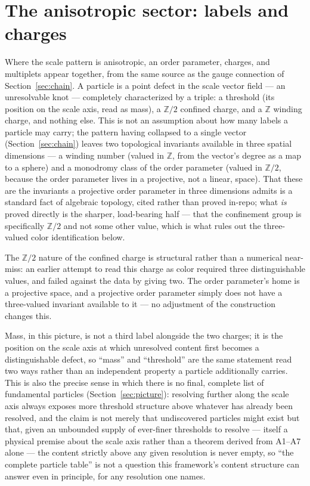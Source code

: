 \documentclass[aps,prd,twocolumn,superscriptaddress,nofootinbib]{revtex4-2}
\begin{document}
\section{The anisotropic sector: labels and charges}\label{sec:particles}

Where the scale pattern is anisotropic, an order parameter, charges, and
multiplets appear together, from the same source as the gauge connection
of Section~\ref{sec:chain}. A particle is a point defect in the scale
vector field — an unresolvable knot — completely characterized by a
triple: a threshold (its position on the scale axis, read as mass), a
$\mathbb{Z}/2$ confined charge, and a $\mathbb{Z}$ winding charge, and
nothing else. This is not an assumption about how many labels a particle
may carry; the pattern having collapsed to a single vector
(Section~\ref{sec:chain}) leaves two topological invariants available in
three spatial dimensions — a winding number (valued in $\mathbb{Z}$,
from the vector's degree as a map to a sphere) and a monodromy class of
the order parameter (valued in $\mathbb{Z}/2$, because the order
parameter lives in a projective, not a linear, space). That these are
the invariants a projective order parameter in three dimensions admits
is a standard fact of algebraic topology, cited rather than proved
in-repo; what \emph{is} proved directly is the sharper, load-bearing
half — that the confinement group is specifically $\mathbb{Z}/2$ and not
some other value, which is what rules out the three-valued color
identification below.

The $\mathbb{Z}/2$ nature of the confined charge is structural rather
than a numerical near-miss: an earlier attempt to read this charge as
color required three distinguishable values, and failed against the data
by giving two. The order parameter's home is a projective space, and a
projective order parameter simply does not have a three-valued invariant
available to it — no adjustment of the construction changes this.

Mass, in this picture, is not a third label alongside the two charges; it
is the position on the scale axis at which unresolved content first
becomes a distinguishable defect, so ``mass'' and ``threshold'' are the
same statement read two ways rather than an independent property a
particle additionally carries. This is also the precise sense in which
there is no final, complete list of fundamental particles
(Section~\ref{sec:picture}): resolving further along the scale axis
always exposes more threshold structure above whatever has already been
resolved, and the claim is not merely that undiscovered particles might
exist but that, given an unbounded supply of ever-finer thresholds to
resolve — itself a physical premise about the scale axis rather than a
theorem derived from A1–A7 alone — the content strictly above any given
resolution is never empty, so ``the complete particle table'' is not a
question this framework's content structure can answer even in
principle, for any resolution one names.
\end{document}
